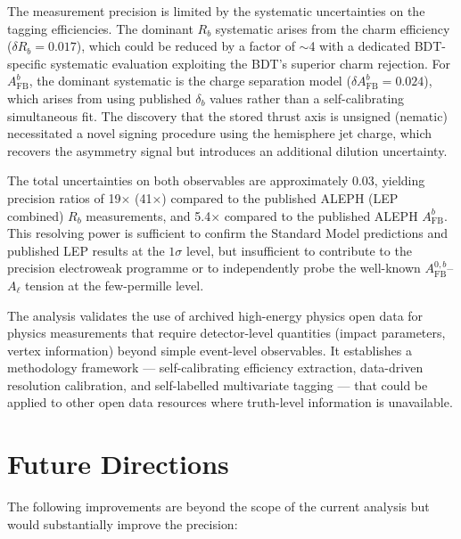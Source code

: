 \documentclass[11pt,a4paper]{article}
\begin{document}
The measurement precision is limited by the systematic uncertainties on
the tagging efficiencies.  The dominant $R_b$ systematic arises from the
charm efficiency ($\delta R_b = 0.017$), which could be reduced by a
factor of $\sim$4 with a dedicated BDT-specific systematic evaluation
exploiting the BDT's superior charm rejection.  For $A_\mathrm{FB}^b$,
the dominant systematic is the charge separation model
($\delta A_\mathrm{FB}^b = 0.024$), which arises from using published
$\delta_b$ values rather than a self-calibrating simultaneous fit.
The discovery that the stored thrust axis is unsigned (nematic)
necessitated a novel signing procedure using the hemisphere jet charge,
which recovers the asymmetry signal but introduces an additional
dilution uncertainty.

The total uncertainties on both observables are approximately 0.03,
yielding precision ratios of 19$\times$ (41$\times$) compared to the
published ALEPH (LEP combined) $R_b$ measurements, and 5.4$\times$
compared to the published ALEPH $A_\mathrm{FB}^b$.  This resolving power
is sufficient to confirm the Standard Model predictions and published LEP
results at the $1\sigma$ level, but insufficient to contribute to the
precision electroweak programme or to independently probe the well-known
$A_\mathrm{FB}^{0,b}$--$A_\ell$ tension at the few-permille level.

The analysis validates the use of archived high-energy physics open data
for physics measurements that require detector-level quantities
(impact parameters, vertex information) beyond simple event-level
observables.  It establishes a methodology framework --- self-calibrating
efficiency extraction, data-driven resolution calibration, and
self-labelled multivariate tagging --- that could be applied to other
open data resources where truth-level information is unavailable.

\section{Future Directions}
\label{sec:future}

The following improvements are beyond the scope of the current analysis
but would substantially improve the precision:
\end{document}
